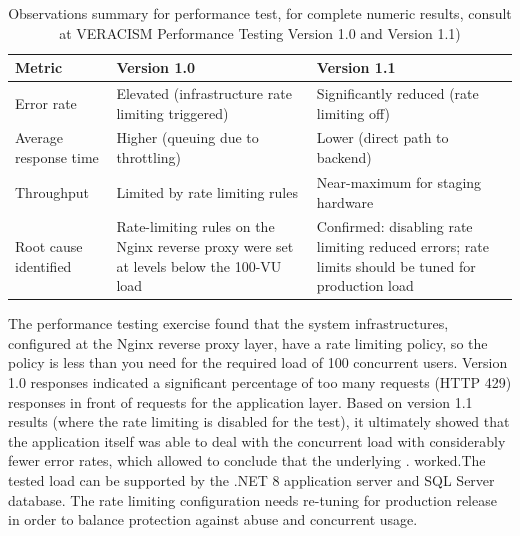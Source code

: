 \begin{table}[H]
  \centering
  \smalltable
  \footnotesize
  {%
  \setlength{\tabcolsep}{6pt}
  \renewcommand{\arraystretch}{1.3}
  \begin{tabular}{|>{\raggedright\arraybackslash}p{}|
                  >{\centering\arraybackslash}p{}|
                  >{\centering\arraybackslash}p{}|}
    \hline
    \textbf{Metric} & \textbf{Version 1.0} & \textbf{Version 1.1} \\
    \hline\hline
    Error rate & Elevated (infrastructure rate limiting triggered) & Significantly reduced (rate limiting off) \\
    \hline
    Average response time & Higher (queuing due to throttling) & Lower (direct path to backend) \\
    \hline
    Throughput & Limited by rate limiting rules & Near-maximum for staging hardware \\
    \hline
    Root cause identified & Rate-limiting rules on the Nginx reverse proxy were set at levels below the 100-VU load & Confirmed: disabling rate limiting reduced errors; rate limits should be tuned for production load \\
    \hline
  \end{tabular}
  }%
  \captionsetup{type=table}
  \caption{Observations summary for performance test, for complete numeric results, consult at VERACISM Performance Testing Version 1.0 and Version 1.1)}
  \label{tab:perf-observations}
\end{table}

\noindent The performance testing exercise found that the system infrastructures, configured at the Nginx reverse proxy layer, have a rate limiting policy, so the policy is less than you need for the required load of 100 concurrent users. Version 1.0 responses indicated a significant percentage of too many requests (HTTP 429) responses in front of requests for the application layer. Based on version 1.1 results (where the rate limiting is disabled for the test), it ultimately showed that the application itself was able to deal with the concurrent load with considerably fewer error rates, which allowed to conclude that the underlying . worked.The tested load can be supported by the .NET 8 application server and SQL Server database. The rate limiting configuration needs re-tuning for production release in order to balance protection against abuse and concurrent usage.

